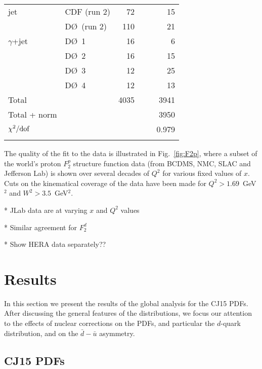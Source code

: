 \documentclass[aps,prd,amsmath,preprint]{revtex4}
\begin{document}
\begin{table}[tb]
{\begin{tabular}[c]{llrr}
jet
  & CDF  (run 2)       	\cite{CDFjet2}  &  72 &  15 \\
  & D\O\ (run 2)       	\cite{D0jet2}   & 110 &  21 \\
$\gamma$+jet
  & D\O\ 1           	\cite{D0gamjet} &  16 &   6 \\    
  & D\O\ 2           	\cite{D0gamjet} &  16 &  15 \\
  & D\O\ 3           	\cite{D0gamjet} &  12 &  25 \\
  & D\O\ 4           	\cite{D0gamjet} &  12 &  13 \\ \hline
%
Total        		&		& 4035 &\ \ \ \ 3941 \\
Total + norm 		&		&      &\ \ \ \ 3950 \\ \hline
$\chi^2/{\rm dof}$	&		&      & 0.979 \\  \hline\\
%
\end{tabular}
}
\label{tab:chi2}
\end{table}


The quality of the fit to the data is illustrated in Fig.~\ref{fig:F2p},
where a subset of the world's proton $F_2^p$ structure function data
(from BCDMS, NMC, SLAC and Jefferson Lab) is shown over several decades
of $Q^2$ for various fixed values of $x$.  Cuts on the kinematical
coverage of the data have been made for $Q^2 > 1.69$~GeV$^2$ and
$W^2 > 3.5$~GeV$^2$.

* JLab data are at varying $x$ and $Q^2$ values

* Similar agreement for $F_2^d$

* Show HERA data separately??



\section{Results} 
\label{sec:results}

In this section we present the results of the global analysis for
the CJ15 PDFs.  After discussing the general features of the
distributions, we focus our attention to the effects of nuclear
corrections on the PDFs, and particular the $d$-quark distribution,
and on the $\bar d-\bar u$ asymmetry.


\subsection{CJ15 PDFs}
\label{ssec:CJ15pdfs}
\end{document}

